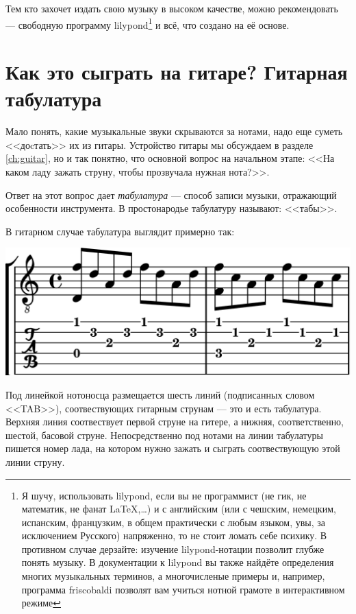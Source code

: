Тем кто захочет издать свою музыку в высоком качестве, можно рекомендовать \cite{url:lilypond} --- свободную программу lilypond\footnote{Я шучу, использовать lilypond, если вы не программист (не гик, не математик, не фанат \LaTeX,\ldots) и с английским (или с чешским, немецким, испанским, французким, в общем практически с любым языком, увы, за исключением Русского) напряженно, то не стоит ломать себе психику. В противном случае дерзайте: изучение lilypond-нотации позволит глубже понять музыку. В документации к lilypond вы также найдёте определения многих музыкальных терминов, а многочисленые примеры и, например, программа friscobaldi позволят вам учиться нотной грамоте в интерактивном режиме} и всё, что создано на её основе.


\section{Как это сыграть на гитаре? Гитарная табулатура}

Мало понять, какие музыкальные звуки скрываются за нотами, надо еще суметь <<доcтать>> их из гитары. Устройство гитары мы обсуждаем в разделе \ref{ch:guitar}, но и так понятно, что основной вопрос на начальном этапе: <<На каком ладу зажать струну, чтобы прозвучала нужная нота?>>. 

Ответ на этот вопрос дает \emph{табулатура} --- способ записи музыки, отражающий особенности инструмента. В простонародье табулатуру называют: <<табы>>.

В гитарном случае табулатура выглядит примерно так:
\begin{center}
    \includegraphics{fig/notes/tab}
\end{center}

Под линейкой нотоносца размещается шесть линий (подписанных словом <<TAB>>), соотвествующих гитарным струнам --- это и есть табулатура. Верхняя линия соотвествует первой струне на гитере, а нижняя, соответственно, шестой, басовой струне. Непосредственно под нотами на линии табулатуры пишется номер лада, на котором нужно зажать и сыграть соотвествующую этой линии струну.

